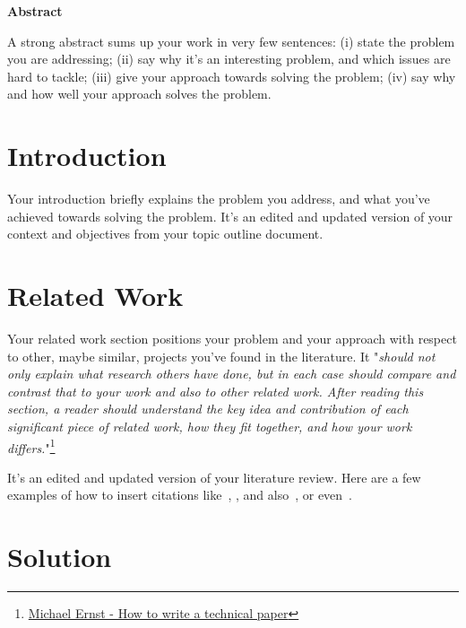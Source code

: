\documentclass{scrartcl}
\renewenvironment{abstract}{
    \begin{center}
    {\Large \textbf{Abstract}}
    \vspace{0.5cm}
    \par\itshape
    \begin{minipage}{0.8\linewidth}}{\end{minipage}
    \noindent\ignorespaces
    \end{center}
}
\begin{document}
\begin{abstract}
  A strong abstract sums up your work in very few sentences:
  (i) state the problem you are addressing;
  (ii) say why it’s an interesting problem, and which issues are hard to tackle;
  (iii) give your approach towards solving the problem;
  (iv) say why and how well your approach solves the problem.
\end{abstract}\vspace{1cm}

\newpage

\tableofcontents

\newpage

\doublespacing
\section{Introduction}

Your introduction briefly explains the problem you address, and what you've achieved towards solving the problem. It's an edited and updated version of your context and objectives from your topic outline document.

\section{Related Work}

Your related work section positions your problem and your approach with respect to other, maybe similar, projects you've found in the literature.
It "\textit{should not only explain what research others have done, but in each case should compare and contrast that to your work and also to other related work. After reading this section, a reader should understand the key idea and contribution of each significant piece of related work, how they fit together, and how your work differs.}"\footnote{\href{https://homes.cs.washington.edu/~mernst/advice/write-technical-paper.html\#related-work}{Michael Ernst - How to write a technical paper}}

It's an edited and updated version of your literature review. Here are a few examples of how to insert citations like~\cite{byzantine-pki}, \cite{atomic-mcast-tcs01}, and also~\cite{sybilattack}, or even~\cite{psn-fail, verisign-fail}.

\section{Solution}
\end{document}
